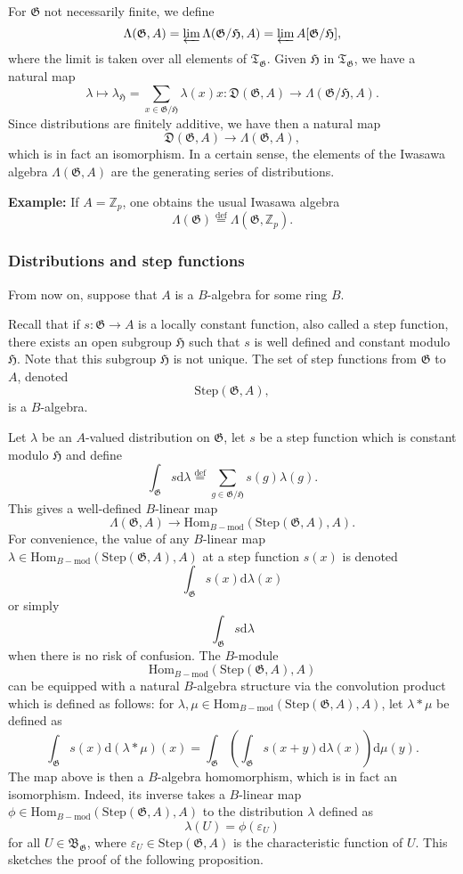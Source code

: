 \documentclass[twoside,10pt]{article}
\newcommand{\rarr}{\rightarrow}
\newcommand{\Z}{\mathbb{Z}}
\newcommand{\T}{\mathfrak{T}}
\newcommand{\B}{\mathfrak{B}}
\newcommand{\Gfrak}{\mathfrak{G}}
\newcommand{\Hfrak}{\mathfrak{H}}
\newcommand{\eqdef}{\overset{\text{def}}{=}}
\newcommand{\Dist}{\mathfrak{D}}
\newcommand{\Hom}{\text{Hom}}
\newcommand{\Step}{\text{Step}}
\newcommand{\charf}{\varepsilon}
\renewcommand{\d}{\text{d}}
\begin{document}
For $\Gfrak$ not necessarily finite, we define
\[\Lambda(\Gfrak,A)=\varprojlim\Lambda(\Gfrak/\Hfrak,A)=\varprojlim A[\Gfrak/\Hfrak],\]
where the limit is taken over all elements of $\T_\Gfrak$. Given $\Hfrak$ in $\T_\Gfrak$, we have a natural map
\[\lambda\mapsto\lambda_\Hfrak=\sum_{x\in\Gfrak/\Hfrak}\lambda(x)x:\Dist(\Gfrak,A)\rarr\Lambda(\Gfrak/\Hfrak,A).\]
Since distributions are finitely additive, we have then a natural map
\[\Dist(\Gfrak,A)\rarr\Lambda(\Gfrak,A),\]
which is in fact an isomorphism. In a certain sense, the elements of the Iwasawa algebra $\Lambda(\Gfrak,A)$ are the generating series of distributions. 

\textbf{Example: } If $A=\Z_p$, one obtains the usual Iwasawa algebra
\[\Lambda(\Gfrak)\eqdef\Lambda(\Gfrak,\Z_p).\]

\subsubsection*{Distributions and step functions}
From now on, suppose that $A$ is a $B$-algebra for some ring $B$.

Recall that if $s:\Gfrak\rightarrow A$ is a locally constant function, also called a step function, there exists an open subgroup $\Hfrak$ such that $s$ is well defined and constant modulo $\Hfrak$. Note that this subgroup $\Hfrak$ is not unique. The set of step functions from $\Gfrak$ to $A$, denoted
\[\Step(\Gfrak,A),\]
is a $B$-algebra.

Let $\lambda$ be an $A$-valued distribution on $\Gfrak$, let $s$ be a step function which is constant modulo $\Hfrak$ and define
\[\int_\Gfrak s\d\lambda\eqdef\sum_{g\in \Gfrak/\Hfrak}s(g)\lambda(g).\]
This gives a well-defined $B$-linear map
\[\Lambda(\Gfrak,A)\rarr\Hom_{B-\text{mod}}(\Step(\Gfrak,A),A).\]
For convenience, the value of any $B$-linear map $\lambda\in\Hom_{B-\text{mod}}(\Step(\Gfrak,A),A)$ at a step function $s(x)$ is denoted
\[\int_{\Gfrak}s(x)\d\lambda(x)\]
or simply
\[\int_{\Gfrak}s\d\lambda\]
when there is no risk of confusion. The $B$-module
\[\Hom_{B-\text{mod}}(\Step(\Gfrak,A),A)\]
can be equipped with a natural $B$-algebra structure via the convolution product which is defined as follows: for $\lambda,\mu\in\Hom_{B-\text{mod}}(\Step(\Gfrak,A),A)$, let $\lambda\ast\mu$ be defined as 
\[\int_{\Gfrak}s(x)\d(\lambda\ast\mu)(x)=\int_{\Gfrak}\left (\int_\Gfrak s(x+y)\d\lambda(x)\right )\d\mu(y).\]
The map above is then a $B$-algebra homomorphism, which is in fact an isomorphism. Indeed, its inverse takes a $B$-linear map
$\phi\in\Hom_{B-\text{mod}}(\Step(\Gfrak,A),A)$ to the distribution $\lambda$ defined as
\[\lambda(U)=\phi(\charf_U)\]
for all $U\in\B_\Gfrak$, where $\charf_U\in\Step(\Gfrak,A)$ is the characteristic function of $U$. This sketches the proof of the following proposition.
\end{document}
